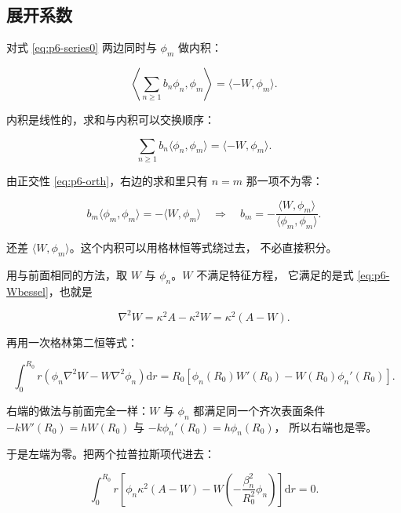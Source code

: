 \subsection{展开系数}

对式 \eqref{eq:p6-series0} 两边同时与 $\phi_m$ 做内积：

\begin{equation}
\left\langle\sum_{n\ge1}b_n\phi_n,\phi_m\right\rangle=\langle -W,\phi_m\rangle .
\end{equation}

内积是线性的，求和与内积可以交换顺序：

\begin{equation}
\sum_{n\ge1}b_n\langle\phi_n,\phi_m\rangle=\langle -W,\phi_m\rangle .
\end{equation}

由正交性 \eqref{eq:p6-orth}，右边的求和里只有 $n=m$ 那一项不为零：

\begin{equation}
b_m\langle\phi_m,\phi_m\rangle=-\langle W,\phi_m\rangle
\quad\Longrightarrow\quad
b_m=-\frac{\langle W,\phi_m\rangle}{\langle\phi_m,\phi_m\rangle}.
\label{eq:p6-bn}
\end{equation}

还差 $\langle W,\phi_m\rangle$。这个内积可以用格林恒等式绕过去，
不必直接积分。

用与前面相同的方法，取 $W$ 与 $\phi_n$。$W$ 不满足特征方程，
它满足的是式 \eqref{eq:p6-Wbessel}，也就是

\begin{equation}
\nabla^2W=\kappa^2A-\kappa^2W=\kappa^2(A-W).
\end{equation}

再用一次格林第二恒等式：

\begin{equation}
\int_0^{R_0} r\left(\phi_n\nabla^2W-W\nabla^2\phi_n\right)\mathrm{d}r
=R_0\left[\phi_n(R_0)W'(R_0)-W(R_0)\phi_n'(R_0)\right].
\end{equation}

右端的做法与前面完全一样：$W$ 与 $\phi_n$ 都满足同一个齐次表面条件
$-kW'(R_0)=hW(R_0)$ 与 $-k\phi_n'(R_0)=h\phi_n(R_0)$，
所以右端也是零。

于是左端为零。把两个拉普拉斯项代进去：

\begin{equation}
\int_0^{R_0} r\left[\phi_n\kappa^2(A-W)-W\left(-\frac{\beta_n^2}{R_0^2}\phi_n\right)\right]\mathrm{d}r=0 .
\end{equation}

